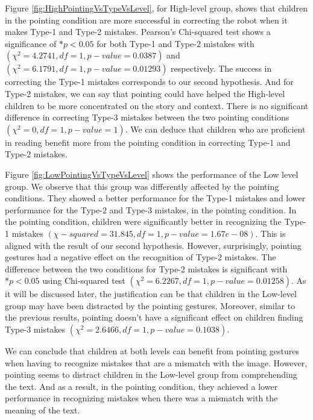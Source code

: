\documentclass{sigchi}
\begin{document}
Figure \ref{fig:HighPointingVsTypeVsLevel}, for High-level group, shows that children in the pointing condition are more successful in correcting the robot when it makes Type-1 and Type-2 mistakes.
Pearson's Chi-squared test shows a significance of $*p<0.05$ for both Type-1 and Type-2 mistakes with $(\chi^2 = 4.2741, df = 1, p-value = 0.0387)$ and $(\chi^2 = 6.1791, df = 1, p-value = 0.01293)$ respectively.
The success in correcting the Type-1 mistakes corresponds to our second hypothesis.
And for Type-2 mistakes, we can say that pointing could have helped the High-level children to be more concentrated on the story and context. 
There is no significant difference in correcting Type-3 mistakes between the two pointing conditions $(\chi^2 = 0, df = 1, p-value = 1)$.
We can deduce that children who are proficient in reading benefit more from the pointing condition in correcting Type-1 and Type-2 mistakes. 

Figure \ref{fig:LowPointingVsTypeVsLevel} shows the performance of the Low level group.
We observe that this group was differently affected by the pointing conditions. 
They showed a better performance for the Type-1 mistakes and lower performance for the Type-2 and Type-3 mistakes, in the pointing condition. 
In the pointing condition, children were significantly better in recognizing the Type-1 mistakes $(\chi-squared = 31.845, df = 1, p-value = 1.67e-08)$. 
This is aligned with the result of our second hypothesis.
However, surprisingly, pointing gestures had a negative effect on the recognition of Type-2 mistakes. 
The difference between the two conditions for Type-2 mistakes is significant with $*p<0.05$ using Chi-squared test $(\chi^2 = 6.2267, df = 1, p-value = 0.01258)$. As it will be discussed later, the justification can be that children in the Low-level group may have been distracted by the pointing gestures.
Moreover, similar to the previous results, pointing doesn't have a significant effect on children finding Type-3 mistakes $(\chi^2 = 2.6466, df = 1, p-value = 0.1038)$.

We can conclude that children at both levels can benefit from pointing gestures when having to recognize mistakes that are a mismatch with the image.
However, pointing seems to distract children in the Low-level group from comprehending the text.
And as a result, in the pointing condition, they achieved a lower performance in recognizing mistakes when there was a mismatch with the meaning of the text.
\end{document}

